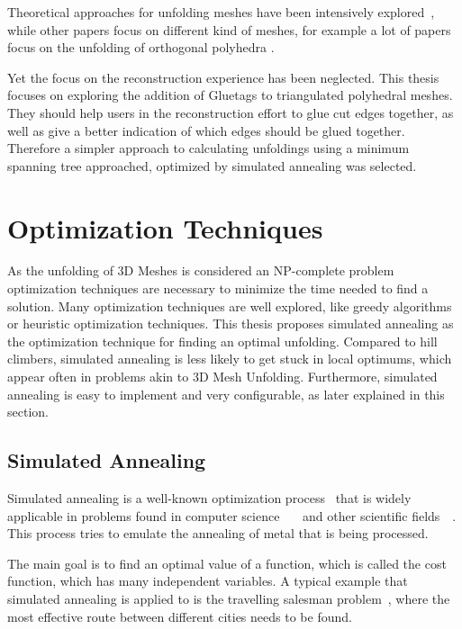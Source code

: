 \documentclass[draft,final]{vutinfth} %
\begin{document}
Theoretical approaches for unfolding meshes have been intensively explored~\cite{shephard1975convex}, while other papers focus on different kind of meshes, for example a lot of papers focus on the unfolding of orthogonal polyhedra \cite{xi2016learning,damian2007epsilon,damian2014unfolding}.

Yet the focus on the reconstruction experience has been neglected. This thesis focuses on exploring the addition of Gluetags to triangulated polyhedral meshes. They should help users in the reconstruction effort to glue cut edges together, as well as give a better indication of which edges should be glued together. Therefore a simpler approach to calculating unfoldings using a minimum spanning tree approached, optimized by simulated annealing was selected.

\section{Optimization Techniques}
\label{sec:sa}
As the unfolding of 3D Meshes is considered an NP-complete problem\cite{haenselmann2012optimal} optimization techniques are necessary to minimize the time needed to find a solution. Many optimization techniques are well explored, like greedy algorithms\cite{devore1996some} or heuristic optimization techniques\cite{lee2008modern}. This thesis proposes simulated annealing as the optimization technique for finding an optimal unfolding. Compared to hill climbers, simulated annealing is less likely to get stuck in local optimums, which appear often in problems akin to 3D Mesh Unfolding. Furthermore, simulated annealing is easy to implement and very configurable, as later explained in this section.

\subsection{Simulated Annealing}

Simulated annealing is a well-known optimization process~\cite{kirkpatrick1983optimization} that is widely applicable in problems found in computer science~\cite{goffe1994global}~\cite{dekkers1991global}~\cite{brooks1995optimization} and other scientific fields~\cite{pannetier1990prediction}~\cite{sutter1995automated}. This process tries to emulate the annealing of metal that is being processed.

The main goal is to find an optimal value of a function, which is called the cost function, which has many independent variables. A typical example that simulated annealing is applied to is the travelling salesman problem~\cite{malek1989serial}, where the most effective route between different cities needs to be found. 
\end{document}

